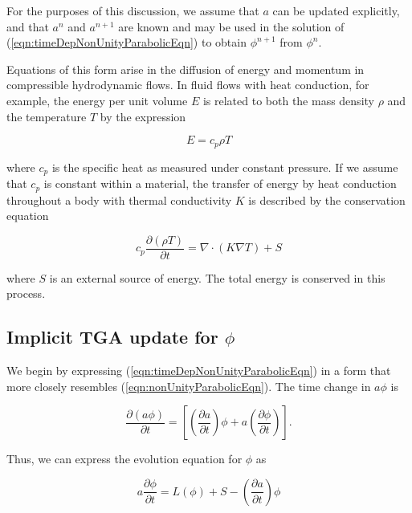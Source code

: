 For the purposes of this discussion, we assume that $a$ can be updated 
explicitly, and that $a^n$ and $a^{n+1}$ are known and may be used in the 
solution of (\ref{eqn:timeDepNonUnityParabolicEqn}) to obtain $\phi^{n+1}$ from 
$\phi^n$.

Equations of this form arise in the diffusion of energy and momentum in 
compressible hydrodynamic flows.  In fluid flows with heat conduction, for 
example, the energy per unit volume $E$ is related to both the mass density 
$\rho$ and the temperature $T$ by the expression 

\begin{equation}
E = c_p \rho T
\end{equation}

\noindent
where $c_p$ is the specific heat as measured under constant pressure. If we 
assume that $c_p$ is constant within a material, the transfer of energy by 
heat conduction throughout a body with thermal conductivity $K$ is described 
by the conservation equation 

\begin{equation}
c_p \frac{\partial (\rho T)}{\partial t} = \nabla \cdot (K \nabla T) + S
\label{eqn:heatConductionEqn}
\end{equation}

\noindent
where $S$ is an external source of energy. The total energy is conserved in 
this process. 

\subsection{Implicit TGA update for $\phi$}

We begin by expressing (\ref{eqn:timeDepNonUnityParabolicEqn}) in a form that 
more closely resembles (\ref{eqn:nonUnityParabolicEqn}). The time change in 
$a \phi$ is

\begin{equation}
\frac{\partial (a \phi)}{\partial t} = 
  \left[\left(\frac{\partial a}{\partial t}\right) \phi + 
            a \left(\frac{\partial \phi}{\partial t}\right)\right].
\end{equation}

\noindent
Thus, we can express the evolution equation for $\phi$ as

\begin{equation}
a \frac{\partial \phi}{\partial t} = L(\phi) + S 
 - \left(\frac{\partial a}{\partial t}\right) \phi
\label{eqn:dphidt}
\end{equation}

